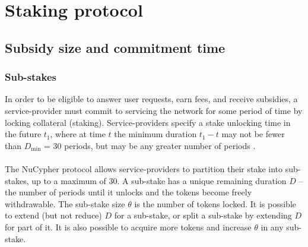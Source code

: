 \documentclass[longbibliography,nofootinbib]{revtex4-1}
\begin{document}
\section{Staking protocol}

\subsection{Subsidy size and commitment time}

\subsubsection{Sub-stakes}

In order to be eligible to answer user requests, earn fees, and receive subsidies, a service-provider must commit to servicing the network for some period of time by locking collateral (staking). Service-providers specify a stake unlocking time in the future $t_1$, where at time $t$ the minimum duration $t_1 - t$ may not be fewer than $D_{\min}$ = 30 periods, but may be any greater number of periods .
\\\\
The NuCypher protocol allows service-providers to partition their stake into sub-stakes, up to a maximum of 30. A sub-stake has a unique remaining duration $D$ – the number of periods until it unlocks and the tokens become freely withdrawable. The sub-stake size $\theta$ is the number of tokens locked. It is possible to extend (but not reduce) $D$ for a sub-stake, or split a sub-stake by extending $D$ for part of it. It is also possible to acquire more tokens and increase $\theta$ in any sub-stake.
\end{document}
